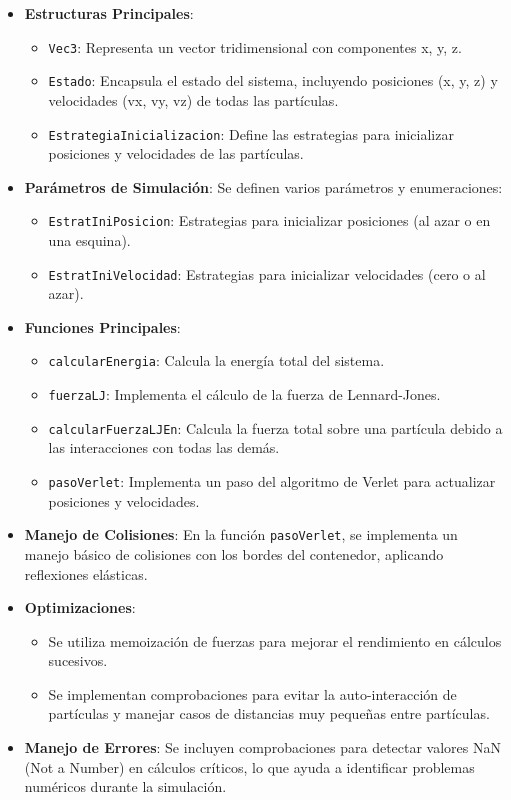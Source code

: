 \documentclass[twocolumn]{article}
\begin{document}
\begin{itemize}
    \item \textbf{Estructuras Principales}:
    \begin{itemize}
        \item \texttt{Vec3}: Representa un vector tridimensional con componentes x, y, z.
        \item \texttt{Estado}: Encapsula el estado del sistema, incluyendo posiciones (x, y, z) y velocidades (vx, vy, vz) de todas las partículas.
        \item \texttt{EstrategiaInicializacion}: Define las estrategias para inicializar posiciones y velocidades de las partículas.
    \end{itemize}

    \item \textbf{Parámetros de Simulación}: Se definen varios parámetros y enumeraciones:
    \begin{itemize}
        \item \texttt{EstratIniPosicion}: Estrategias para inicializar posiciones (al azar o en una esquina).
        \item \texttt{EstratIniVelocidad}: Estrategias para inicializar velocidades (cero o al azar).
    \end{itemize}

    \item \textbf{Funciones Principales}:
    \begin{itemize}
        \item \texttt{calcularEnergia}: Calcula la energía total del sistema.
        \item \texttt{fuerzaLJ}: Implementa el cálculo de la fuerza de Lennard-Jones.
        \item \texttt{calcularFuerzaLJEn}: Calcula la fuerza total sobre una partícula debido a las interacciones con todas las demás.
        \item \texttt{pasoVerlet}: Implementa un paso del algoritmo de Verlet para actualizar posiciones y velocidades.
    \end{itemize}

    \item \textbf{Manejo de Colisiones}: En la función \texttt{pasoVerlet}, se implementa un manejo básico de colisiones con los bordes del contenedor, aplicando reflexiones elásticas.

    \item \textbf{Optimizaciones}:
    \begin{itemize}
        \item Se utiliza memoización de fuerzas para mejorar el rendimiento en cálculos sucesivos.
        \item Se implementan comprobaciones para evitar la auto-interacción de partículas y manejar casos de distancias muy pequeñas entre partículas.
    \end{itemize}

    \item \textbf{Manejo de Errores}: Se incluyen comprobaciones para detectar valores NaN (Not a Number) en cálculos críticos, lo que ayuda a identificar problemas numéricos durante la simulación.
\end{itemize}
\end{document}
